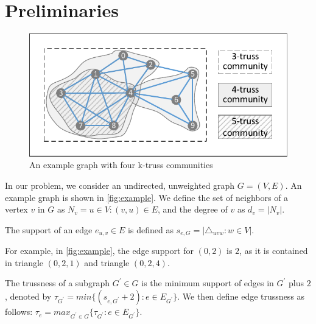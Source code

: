 \section{Preliminaries}
\label{preliminary}

\begin{figure}[ht]
    \centering
    \includegraphics[width=0.7\linewidth, trim={0.6cm 0.6cm, 0.6cm, 0.6cm}, clip]{./figures/k-truss.pdf}
		\vspace{-0.2cm}
    \caption{An example graph with four k-truss communities}
    \label{fig:example}
		\vspace{-0.2cm}
\end{figure}

In our problem, we consider an undirected, unweighted graph $G = (V,E)$. An example graph is shown in \autoref{fig:example}.
We define the set of neighbors of a vertex $v$ in $G$ as $N_v = {u \in V :(v, u) \in E}$, and the degree of $v$ as $d_v = |N_v|$. %

\begin{Def}
The support of an edge $e_{u,v} \in E$ is defined as $s_{e,G} = |{\triangle_{uvw} : w \in V}|$. 
\label{def:edge_support}
\end{Def}

For example, in \autoref{fig:example}, the edge support for $(0,2)$ is $2$, as it is contained in triangle $(0,2,1)$ and triangle $(0,2,4)$.

\begin{Def}[Trussness] 
The trussness of a subgraph $G^{\prime} \in G$ is the minimum support of edges in $G^{\prime}$ plus $2$, denoted by $\tau_{G^{\prime}} = min\{(s_{e,G^{\prime}} + 2): e \in E_{G^{\prime}}\} $.  We then define edge trussness as follows: $\tau_{e} = max_{G^{\prime} \in G}\{\tau_{G^{\prime}}: e \in E_{G^{\prime}}\}$.
\label{def:trussness}
\end{Def}

